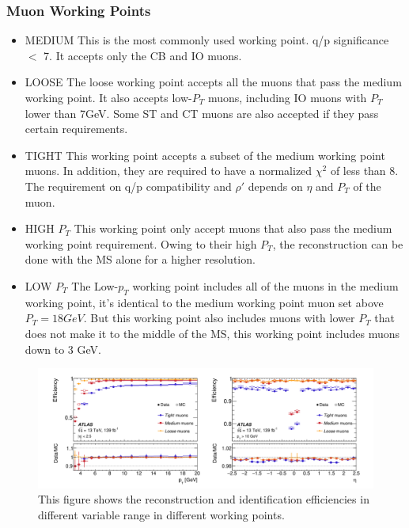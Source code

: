 \subsubsection*{Muon Working Points}
\begin{itemize}

\item MEDIUM \newline
This is the most commonly used working point. q/p significance $<$ 7. It accepts only the CB and IO muons.  

\item LOOSE \newline
    The loose working point accepts all the muons that pass the medium working point. It also accepts low-$P_{T}$ muons, including IO muons with $P_{T}$ lower than 7GeV. Some ST and CT muons are also accepted if they pass certain requirements. 

\item TIGHT \newline
    This working point accepts a subset of the medium working point muons. In addition, they are required to have a normalized $\chi^{2}$ of less than 8. The requirement on q/p compatibility and $\rho'$ depends on $\eta$ and $P_{T}$ of the muon.

\item HIGH $P_{T}$ \newline
This working point only accept muons that also pass the medium working point requirement. Owing to their high $P_{T}$, the reconstruction can be done with the MS alone for a higher resolution.

\item LOW $P_{T}$ \newline
The Low-$p_{T}$ working point includes all of the muons in the medium working point, it's identical to the medium working point muon set above $P_{T}=18GeV$. But this working point also includes muons with lower $P_{T}$ that does not make it to the middle of the MS, this working point includes muons down to 3 GeV. 

\end{itemize}

\begin{figure}[!htb]
    \begin{center}
        \includegraphics[width=1\textwidth]{figures/common_ana/IdentificationEff}
        \caption{
            This figure shows the reconstruction and identification efficiencies in different variable range in different working points\cite{Aad:2746302}.
    }
        \label{fig:isolationWP}
    \end{center}
\end{figure}



